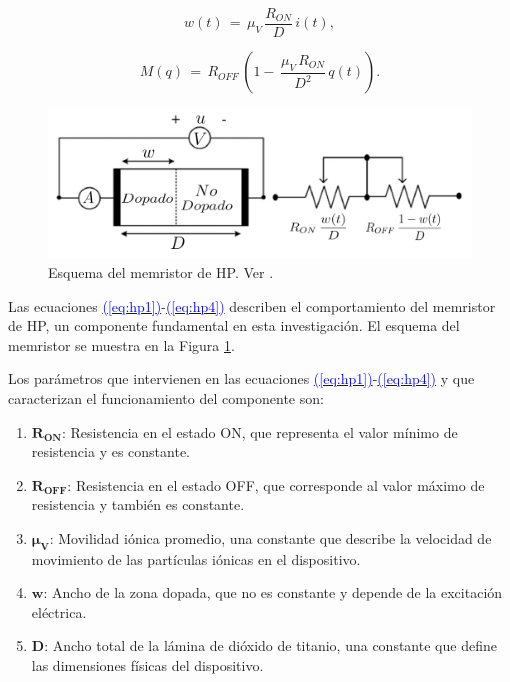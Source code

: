 \documentclass[12pt,a4paper]{report} %
\newcommand{\eref}[1]{\hyperref[#1]{\textcolor{blue}{(\ref*{#1})}}}
\newcommand{\eref}[1]{\hyperref[#1]{\textcolor{blue}{\textit{(\ref*{#1})}}}}
\begin{document}
	\begin{equation}
		w(t)\,=\,\mu_V\,\frac{R_{ON}}{D}\,i(t),
		\label{eq:hp3}
	\end{equation}\smallskip
	
	\begin{equation}
		M(q)\,=\,R_{OFF}\,\left(1-\,\frac{\mu_V\,R_{ON}}{D^2}\,q(t)\right).
		\label{eq:hp4}
	\end{equation}\smallskip
	
	\vspace{1cm}\begin{figure}[h]
		\centering
		\includegraphics[width=1\textwidth]{schmem.jpg}
		\caption{Esquema del memristor de HP. Ver \cite{2021}.}
		\label{fig:2021}
	\end{figure}\smallskip

	\vspace{0.5cm}\noindent Las ecuaciones \eref{eq:hp1}-\eref{eq:hp4} describen el comportamiento del memristor de HP, un componente fundamental en esta investigación. El esquema del memristor se muestra en la Figura \ref{fig:2021}.
	
	\newpage
	
	\noindent Los parámetros que intervienen en las ecuaciones \eref{eq:hp1}-\eref{eq:hp4} y que caracterizan el funcionamiento del componente son:
	
	\begin{enumerate}
		\item $\bm{R_{ON}}$: Resistencia en el estado ON, que representa el valor mínimo de resistencia y es constante.
		\item $\bm{R_{OFF}}$: Resistencia en el estado OFF, que corresponde al valor máximo de resistencia y también es constante.
		\item $\bm{\mu_V}$: Movilidad iónica promedio, una constante que describe la velocidad de movimiento de las partículas iónicas en el dispositivo.
		\item $\bm{w}$: Ancho de la zona dopada, que no es constante y depende de la excitación eléctrica.
		\item $\bm{D}$: Ancho total de la lámina de dióxido de titanio, una constante que define las dimensiones físicas del dispositivo.
	\end{enumerate}
	
\end{document}
